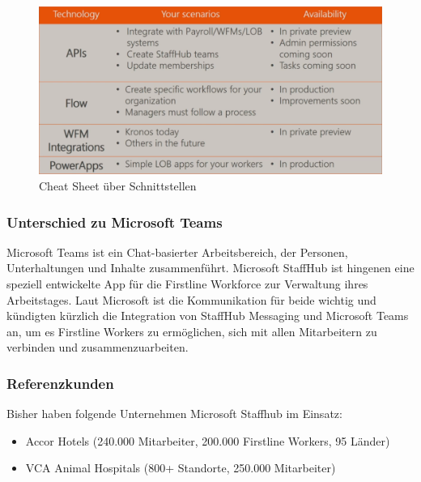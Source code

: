 \begin{figure}[H] 
\centering 
\includegraphics[scale=0.42]{images/msapi} 
\caption[Cheat Sheet über Schnittstellen]{Cheat Sheet über Schnittstellen\protect} 
\label{ws} 
\end{figure}

\subsubsection{Unterschied zu Microsoft Teams}
Microsoft Teams ist ein Chat-basierter Arbeitsbereich, der Personen, Unterhaltungen und Inhalte zusammenführt. Microsoft StaffHub ist hingenen eine speziell entwickelte App für die Firstline Workforce zur Verwaltung ihres Arbeitstages. Laut Microsoft ist die Kommunikation für beide wichtig und kündigten kürzlich die Integration von StaffHub Messaging und Microsoft Teams an, um es Firstline Workers zu ermöglichen, sich mit allen Mitarbeitern zu verbinden und zusammenzuarbeiten.

\subsubsection{Referenzkunden}
Bisher haben folgende Unternehmen Microsoft Staffhub im Einsatz: 

\begin{itemize}
\item Accor Hotels (240.000 Mitarbeiter, 200.000 Firstline Workers, 95 Länder)
\item VCA Animal Hospitals (800+ Standorte, 250.000 Mitarbeiter)
\end{itemize}
 
